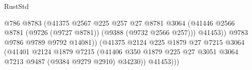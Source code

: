 \begin{lexlean}{RustStd}
\begin{coremodule}
                                                      @786
                                                      @8783
                                                      (@41375
                                                        @2567
                                                        @225
                                                        @257
                                                        @27
                                                        @8781
                                                        @3064
                                                        (@41446
                                                          @2566
                                                          @8781
                                                          (@9726 (@9727 @8781))
                                                          (@9388 (@9732 @2566 @257)))
                                                        @41453))
                                                    @9783
                                                    @9786
                                                    @9789
                                                    @9792
                                                    @14081))
                                                (@41375
                                                  @2124
                                                  @225
                                                  @1879
                                                  @27
                                                  @7215
                                                  @3064
                                                  (@41401
                                                    @2124
                                                    @1879
                                                    @7215
                                                    (@41406
                                                      @350
                                                      @1879
                                                      @225
                                                      @27
                                                      @3051
                                                      @3064
                                                      @7213
                                                      @9487
                                                      (@9384 @9279 @2910)
                                                      @34230))
                                                  @41453)))

\end{coremodule}
\end{lexlean}

